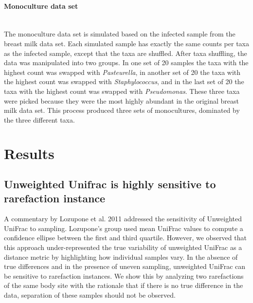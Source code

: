 \documentclass[10pt,letterpaper]{article}
\begin{document}
\paragraph{Monoculture data set}\mbox{}\\
The monoculture data set is simulated based on the infected sample from the breast milk data set. Each simulated sample has exactly the same counts per taxa as the infected sample, except that the taxa are shuffled. After taxa shuffling, the data was manipulated into two groups. In one set of 20 samples the taxa with the highest count was swapped with \textit{Pasteurella}, in another set of 20 the taxa with the highest count was swapped with \textit{Staphylococcus}, and in the last set of 20 the taxa with the highest count was swapped with \textit{Pseudomonas}. These three taxa were picked because they were the most highly abundant in the original breast milk data set. This process produced three sets of monocultures, dominated by the three different taxa.

\section*{Results}

\subsection{Unweighted Unifrac is highly sensitive to rarefaction instance}

A commentary by Lozupone et al. 2011 \cite{lozupone2011unifrac} addressed the sensitivity of Unweighted UniFrac to sampling. Lozupone's group used mean UniFrac values to compute a confidence ellipse between the first and third quartile. However, we observed that this approach under-represented the true variability of unweighted UniFrac as a distance metric by highlighting how individual samples vary. In the absence of true differences and in the presence of uneven sampling, unweighted UniFrac can be sensitive to rarefaction instances. We show this by analyzing two rarefactions of the same body site with the rationale that if there is no true difference in the data, separation of these samples should not be observed.
\end{document}
